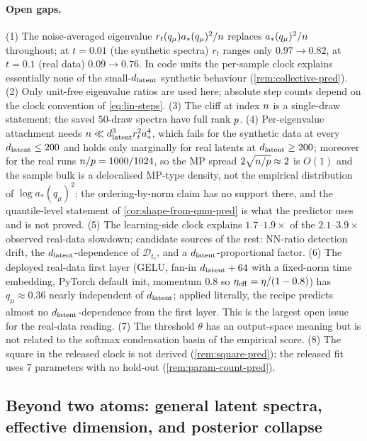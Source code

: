 \paragraph{Open gaps.}
(1) The noise-averaged eigenvalue $r_t(q_\mu)a_*(q_\mu)^2/n$ replaces $a_*(q_\mu)^2/n$ throughout; at $t=0.01$ (the synthetic spectra) $r_t$ ranges only $0.97\to0.82$, at $t=0.1$ (real data) $0.09\to0.76$. In code units the per-sample clock explains essentially none of the small-$d_{\mathrm{latent}}$ synthetic behaviour (\cref{rem:collective-pred}). (2) Only unit-free eigenvalue ratios are used here; absolute step counts depend on the clock convention of \eqref{eq:lin-steps}. (3) The cliff at index $n$ is a single-draw statement; the saved $50$-draw spectra have full rank $p$. (4) Per-eigenvalue attachment needs $n\ll d_{\mathrm{latent}}^3r_t^2a_*^4$, which fails for the synthetic data at every $d_{\mathrm{latent}}\le200$ and holds only marginally for real latents at $d_{\mathrm{latent}}\ge200$; moreover for the real runs $n/p=1000/1024$, so the MP spread $2\sqrt{n/p}\approx2$ is $O(1)$ and the sample bulk is a delocalised MP-type density, not the empirical distribution of $\log a_*(q_\mu)^2$: the ordering-by-norm claim has no support there, and the quantile-level statement of \cref{cor:shape-from-qmu-pred} is what the predictor uses and is not proved. (5) The learning-side clock explains $1.7$--$1.9\times$ of the $2.1$--$3.9\times$ observed real-data slowdown; candidate sources of the rest: NN-ratio detection drift, the $d_{\mathrm{latent}}$-dependence of $\mathcal D_{t_c}$, and a $d_{\mathrm{latent}}$-proportional factor. (6) The deployed real-data first layer (GELU, fan-in $d_{\mathrm{latent}}+64$ with a fixed-norm time embedding, PyTorch default init, momentum $0.8$ so $\eta_{\rm eff}=\eta/(1-0.8)$) has $q_\mu\approx0.36$ nearly independent of $d_{\mathrm{latent}}$; applied literally, the recipe predicts almost no $d_{\mathrm{latent}}$-dependence from the first layer. This is the largest open issue for the real-data reading. (7) The threshold $\theta$ has an output-space meaning but is not related to the softmax condensation basin of the empirical score. (8) The square in the released clock is not derived (\cref{rem:square-pred}); the released fit uses 7 parameters with no hold-out (\cref{rem:param-count-pred}).

\subsection{Beyond two atoms: general latent spectra, effective dimension, and posterior collapse}
\label{app:theory-general}

